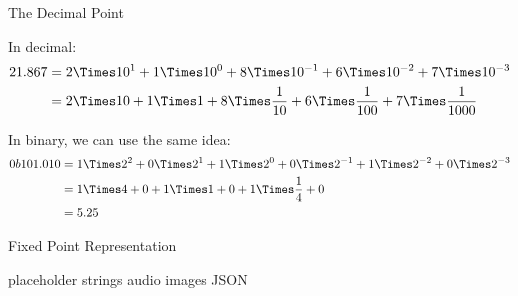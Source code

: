 \begin{frame}{The Decimal Point}

    In decimal:
    \begin{align*}
        21.867 & = 2 \Times 10^1 + 1 \Times 10^0 + 8 \Times 10^{-1} + 6 \Times 10^{-2} + 7 \Times 10^{-3}             \\
               & =2 \Times 10 + 1 \Times 1 + 8 \Times \frac{1}{10} + 6 \Times \frac{1}{100} + 7 \Times \frac{1}{1000} \\
    \end{align*}

    In binary, we can use the same idea:
    \begin{align*}
        0b101.010 & = 1 \Times 2^2 + 0 \Times 2^1 + 1 \Times 2^0 + 0 \Times 2^{-1} + 1 \Times 2^{-2} + 0 \Times 2^{-3} \\
                  & = 1 \Times 4 + 0 + 1 \Times 1 + 0 + 1 \Times \frac{1}{4} + 0                                       \\
                  & = 5.25                                                                                             \\
    \end{align*}

\end{frame}

\begin{frame}{Fixed Point Representation}

\end{frame}


\begin{frame}{placeholder}
    strings
    audio
    images
    JSON
\end{frame}

